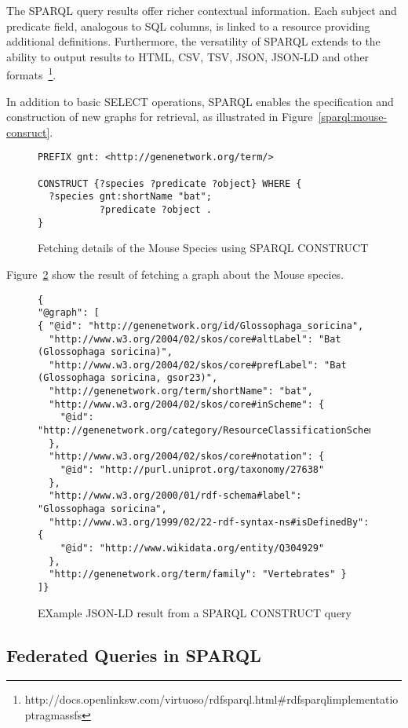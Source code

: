 The SPARQL query results offer richer contextual information.  Each subject and predicate field, analogous to SQL columns, is linked to a resource providing additional definitions.  Furthermore, the versatility of SPARQL extends to the ability to output results to HTML, CSV, TSV, JSON, JSON-LD and other formats~\footnote{http://docs.openlinksw.com/virtuoso/rdfsparql.html\#rdfsparqlimplementatioptragmassfs}.

In addition to basic SELECT operations, SPARQL enables the specification and construction of new graphs for retrieval, as illustrated in Figure~\ref{sparql:mouse-consruct}.

\begin{figure}[H]
\centering
\begin{verbatim}
PREFIX gnt: <http://genenetwork.org/term/>

CONSTRUCT {?species ?predicate ?object} WHERE {
  ?species gnt:shortName "bat";
           ?predicate ?object .
}
\end{verbatim}
\caption{Fetching details of the Mouse Species using SPARQL CONSTRUCT}\label{sparql:mouse-construct}
\end{figure}

Figure~\ref{sparql:mouse-graph} show the result of fetching a graph about the Mouse species.

\begin{figure}[H]
\centering
\begin{verbatim}
{
"@graph": [
{ "@id": "http://genenetwork.org/id/Glossophaga_soricina",
  "http://www.w3.org/2004/02/skos/core#altLabel": "Bat (Glossophaga soricina)",
  "http://www.w3.org/2004/02/skos/core#prefLabel": "Bat (Glossophaga soricina, gsor23)",
  "http://genenetwork.org/term/shortName": "bat",
  "http://www.w3.org/2004/02/skos/core#inScheme": {
    "@id": "http://genenetwork.org/category/ResourceClassificationScheme"
  },
  "http://www.w3.org/2004/02/skos/core#notation": {
    "@id": "http://purl.uniprot.org/taxonomy/27638"
  },
  "http://www.w3.org/2000/01/rdf-schema#label": "Glossophaga soricina",
  "http://www.w3.org/1999/02/22-rdf-syntax-ns#isDefinedBy": {
    "@id": "http://www.wikidata.org/entity/Q304929"
  },
  "http://genenetwork.org/term/family": "Vertebrates" }
]}
\end{verbatim}
\caption{EXample JSON-LD result from a SPARQL CONSTRUCT query}\label{sparql:mouse-graph}
\end{figure}


\subsection{Federated Queries in SPARQL}


